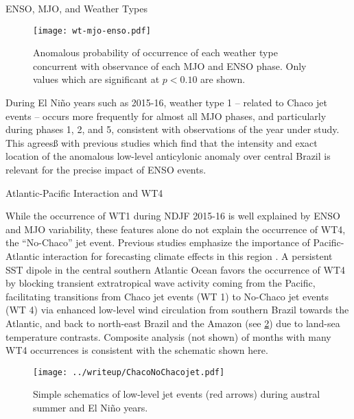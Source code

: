 \begin{block}{ENSO, MJO, and Weather Types}
  \begin{mdframed}
  \begin{figure}
    \caption{
  		Anomalous probability of occurrence of each weather type concurrent with observance of each MJO and ENSO phase.
  		Only values which are significant at $p<0.10$ are shown.
      \label{fig:wt-mjo-enso}
  	}
  	\noindent\texttt{[image: wt-mjo-enso.pdf]}
  \end{figure}
  \end{mdframed}

  During El Ni\~{n}o years such as 2015-16, weather type 1 -- related to Chaco jet events -- occurs more frequently for almost all MJO phases, and particularly during phases 1, 2, and 5, consistent with observations of the year under study.
  This agreesß with previous studies \cite[i.e.][]{Velasco1987} which find that the intensity and exact location of the anomalous low-level anticylonic anomaly over central Brazil is relevant for the precise impact of ENSO events.

\end{block}
\begin{block}{Atlantic-Pacific Interaction and WT4}

  While the occurrence of WT1 during NDJF 2015-16 is well explained by ENSO and MJO variability, these features alone do not explain the occurrence of WT4, the ``No-Chaco'' jet event.
  Previous studies emphasize the importance of Pacific-Atlantic interaction for forecasting climate effects in this region \cite{Vera:2006ib,Barreiro:2017ct,Lima:2017hw,Munoz2015}.
  A persistent SST dipole in the central southern Atlantic Ocean favors the occurrence of WT4 by blocking transient extratropical wave activity coming from the Pacific, facilitating transitions from Chaco jet events (WT 1) to No-Chaco jet events (WT 4) via enhanced low-level wind circulation from southern Brazil towards the Atlantic, and back to north-east Brazil and the Amazon (see \cref{fig:chaco-nochaco}) due to land-sea temperature contrasts.
  Composite analysis (not shown) of months with many WT4 occurrences is consistent with the schematic shown here.

  \begin{mdframed}
  \begin{figure}
  	\noindent\texttt{[image: ../writeup/ChacoNoChacojet.pdf]}
    \caption{
      Simple schematics of low-level jet events (red arrows) during austral summer and El Ni\~no years.
      \label{fig:chaco-nochaco}
  	}

  \end{figure}
  \end{mdframed}
\end{block}
